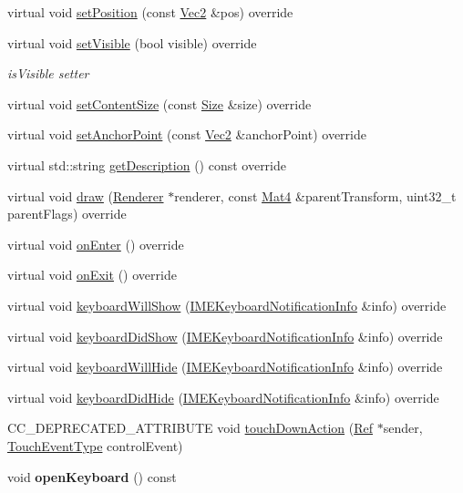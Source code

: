 \begin{DoxyCompactItemize}
\item 
virtual void \hyperlink{classui_1_1EditBox_a92e525c7152c0a974632d4810b392f11}{set\+Position} (const \hyperlink{classVec2}{Vec2} \&pos) override
\item 
virtual void \hyperlink{classui_1_1EditBox_a73a03efc1b904b6386d037fdcdc7ff92}{set\+Visible} (bool visible) override
\begin{DoxyCompactList}\small\item\em is\+Visible setter \end{DoxyCompactList}\item 
virtual void \hyperlink{classui_1_1EditBox_a3fbf590dff29ba873d9c72af308f7edd}{set\+Content\+Size} (const \hyperlink{classSize}{Size} \&size) override
\item 
virtual void \hyperlink{classui_1_1EditBox_a6e433ab6bbaa15560a049dfe05087294}{set\+Anchor\+Point} (const \hyperlink{classVec2}{Vec2} \&anchor\+Point) override
\item 
virtual std\+::string \hyperlink{classui_1_1EditBox_a7b19d7662f3a8ab64601c5c8abd8aada}{get\+Description} () const override
\item 
virtual void \hyperlink{classui_1_1EditBox_ab853853be41d8e50e6b23ca1fcb5641f}{draw} (\hyperlink{classRenderer}{Renderer} $\ast$renderer, const \hyperlink{classMat4}{Mat4} \&parent\+Transform, uint32\+\_\+t parent\+Flags) override
\item 
virtual void \hyperlink{classui_1_1EditBox_a0506cfa2b498d2bcd24c4b85deff123d}{on\+Enter} () override
\item 
virtual void \hyperlink{classui_1_1EditBox_a4c5c9db7c8b7711a719aec6a0842696b}{on\+Exit} () override
\item 
virtual void \hyperlink{classui_1_1EditBox_a5913b44adaf000a76cf35a126fbdeb31}{keyboard\+Will\+Show} (\hyperlink{structIMEKeyboardNotificationInfo}{I\+M\+E\+Keyboard\+Notification\+Info} \&info) override
\item 
virtual void \hyperlink{classui_1_1EditBox_ad5095cb70eebd06257e074c7b043ea89}{keyboard\+Did\+Show} (\hyperlink{structIMEKeyboardNotificationInfo}{I\+M\+E\+Keyboard\+Notification\+Info} \&info) override
\item 
virtual void \hyperlink{classui_1_1EditBox_aabf158a71e53e27677d85b86e9aa4e3a}{keyboard\+Will\+Hide} (\hyperlink{structIMEKeyboardNotificationInfo}{I\+M\+E\+Keyboard\+Notification\+Info} \&info) override
\item 
virtual void \hyperlink{classui_1_1EditBox_a3898b6685b2693973a59d68c328952a0}{keyboard\+Did\+Hide} (\hyperlink{structIMEKeyboardNotificationInfo}{I\+M\+E\+Keyboard\+Notification\+Info} \&info) override
\item 
C\+C\+\_\+\+D\+E\+P\+R\+E\+C\+A\+T\+E\+D\+\_\+\+A\+T\+T\+R\+I\+B\+U\+TE void \hyperlink{classui_1_1EditBox_a74da824c15ca8e40a5e70d39bc036a8a}{touch\+Down\+Action} (\hyperlink{classRef}{Ref} $\ast$sender, \hyperlink{classui_1_1Widget_a4829c0f1cbaf1fd820a9b2ccf0c58c73}{Touch\+Event\+Type} control\+Event)
\item 
\mbox{\label{classui_1_1EditBox_a397a0c3a8c978a49ecaa1c1cb9369ae2}} 
void {\bfseries open\+Keyboard} () const
\end{DoxyCompactItemize}
